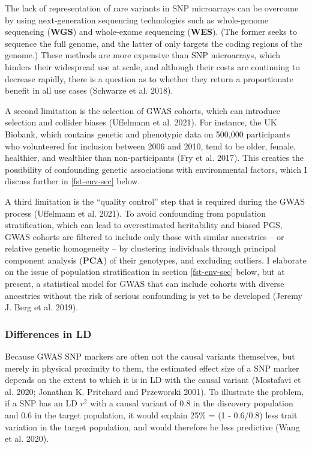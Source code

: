 \documentclass[
]{book}
\begin{document}
The lack of representation of rare variants in SNP microarrays can be overcome by using next-generation sequencing technologies such as whole-genome sequencing (\textbf{WGS}) and whole-exome sequencing (\textbf{WES}). (The former seeks to sequence the full genome, and the latter of only targets the coding regions of the genome.) These methods are more expensive than SNP microarrays, which hinders their widespread use at scale, and although their costs are continuing to decrease rapidly, there is a question as to whether they return a proportionate benefit in all use cases (Schwarze et al. 2018).

A second limitation is the selection of GWAS cohorts, which can introduce selection and collider biases (Uffelmann et al. 2021). For instance, the UK Biobank, which contains genetic and phenotypic data on 500,000 participants who volunteered for inclusion between 2006 and 2010, tend to be older, female, healthier, and wealthier than non-participants (Fry et al. 2017). This creaties the possibility of confounding genetic associations with environmental factors, which I discuss further in \ref{fst-env-sec} below.

A third limitation is the ``quality control'' step that is required during the GWAS process (Uffelmann et al. 2021). To avoid confounding from population stratification, which can lead to overestimated heritability and biased PGS, GWAS cohorts are filtered to include only those with similar ancestries -- or relative genetic homogeneity -- by clustering individuals through principal component analysis (\textbf{PCA}) of their genotypes, and excluding outliers. I elaborate on the issue of population stratification in section \ref{fst-env-sec} below, but at present, a statistical model for GWAS that can include cohorts with diverse ancestries without the risk of serious confounding is yet to be developed (Jeremy J. Berg et al. 2019).

\hypertarget{differences-in-ld}{%
\subsubsection{Differences in LD}\label{differences-in-ld}}

Because GWAS SNP markers are often not the causal variants themselves, but merely in physical proximity to them, the estimated effect size of a SNP marker depends on the extent to which it is in LD with the causal variant (Mostafavi et al. 2020; Jonathan K. Pritchard and Przeworski 2001). To illustrate the problem, if a SNP has an LD \(r^2\) with a causal variant of 0.8 in the discovery population and 0.6 in the target population, it would explain 25\% = (1 - 0.6/0.8) less trait variation in the target population, and would therefore be less predictive (Wang et al. 2020).
\end{document}
